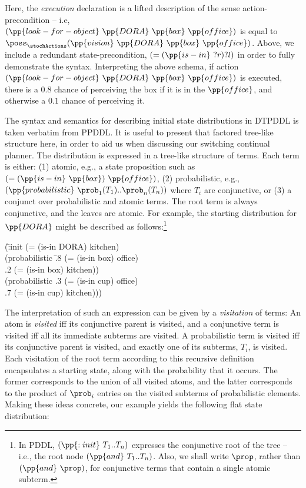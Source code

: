 \documentclass{article}
\begin{document}
\noindent Here, the {\em execution} declaration is a lifted description of
the sense action-precondition -- i.e,
$(\pp{look-for-object}~\pp{DORA}~\pp{box}~\pp{office})$ is equal to
$\poss_\stochActions(\pp{vision}~\pp{DORA}~\pp{box}~\pp{office})$. Above,
we include a redundant state-precondition, $(=(\pp{is-in}~?r)?l)$ in
order to fully demonstrate the syntax. Interpreting the above schema,
if action $(\pp{look-for-object}~\pp{DORA}~\pp{box}~\pp{office})$ is
executed, there is a $0.8$ chance of perceiving the box if it is in
the $\pp{office}$, and otherwise a $0.1$ chance of perceiving it.

The syntax and semantics for describing initial state distributions in
DTPDDL is taken verbatim from PPDDL. It is useful to present that
factored tree-like structure here, in order to aid us when discussing
our switching continual planner. The distribution is expressed in a
tree-like structure of terms. Each term is either: (1) atomic, e.g., a
state proposition such as $(=(\pp{is-in}~\pp{box})~\pp{office})$, (2)
probabilistic, e.g., $(\pp{probabilistic}~\prob_1 (T_1) .. \prob_n
(T_n))$ where $T_i$ are conjunctive, or (3) a conjunct over
probabilistic and atomic terms. The root term is always conjunctive,
and the leaves are atomic. For example, the starting distribution for
$\pp{DORA}$ might be described as follows:\footnote{In PDDL,
$(\pp{:init}~T_1..T_n)$ expresses the conjunctive root of the tree --
i.e., the root node $(\pp{and}~T_1..T_n)$. Also, we shall write
$\prop$, rather than $(\pp{and}~\prop)$, for conjunctive terms
that contain a single atomic subterm.}

\small
\begin{tabtt}
(\=:init (= (is-in DORA) kitchen) \+ \\
       (probabilistic \=.8 (= (is-in box) office)  \\
		      \>.2 (= (is-in box) kitchen)) \\
       (probabilistic .3 (= (is-in cup) office)  \\
		      \>.7 (= (is-in cup) kitchen))) \\
\end{tabtt}
\normalsize


\noindent The interpretation of such an expression can be given
by a {\em visitation} of terms: An atom is {\em visited} iff
its conjunctive parent is visited, and a conjunctive term is visited
iff all its immediate subterms are visited. A probabilistic term is
visited iff its conjunctive parent is visited, and exactly one of its
subterms, $T_i$, is visited. Each visitation of the root term
according to this recursive definition encapsulates a starting state,
along with the probability that it occurs. The former corresponds to the
union of all visited atoms, and the latter corresponds to the product
of $\prob_i$ entries on the visited subterms of probabilistic
elements. Making these ideas concrete, our example yields the
following flat state distribution:
\end{document}
